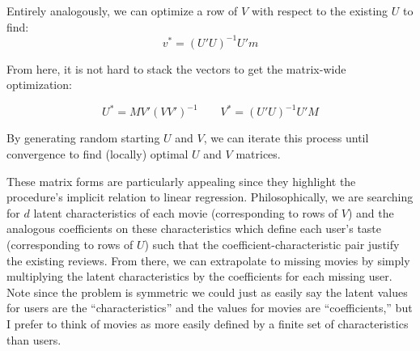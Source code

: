 \documentclass{article}
\begin{document}
\begin{appendices}
Entirely analogously, we can optimize a row of $V$ with respect to the existing $U$ to find:
$$v^* = (U'U)^{-1}U'm$$

From here, it is not hard to stack the vectors to get the matrix-wide optimization:

$$U^* = MV'(VV')^{-1} \qquad V^* = (U'U)^{-1}U'M$$

By generating random starting $U$ and $V$, we can iterate this process until convergence to find (locally) optimal $U$ and $V$ matrices.

These matrix forms are particularly appealing since they highlight the procedure's implicit relation to linear regression. Philosophically, we are searching for $d$ latent characteristics of each movie (corresponding to rows of $V$) and the analogous coefficients on these characteristics which define each user's taste (corresponding to rows of $U$) such that the coefficient-characteristic pair justify the existing reviews. From there, we can extrapolate to missing movies by simply multiplying the latent characteristics by the coefficients for each missing user. Note since the problem is symmetric we could just as easily say the latent values for users are the ``characteristics'' and the values for movies are ``coefficients,'' but I prefer to think of movies as more easily defined by a finite set of characteristics than users.

\end{appendices}
\end{document}
